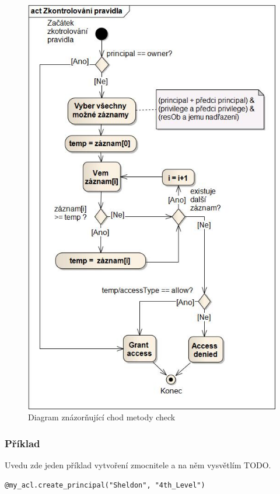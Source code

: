 \begin{figure}
\includegraphics[width=15cm]{check2.jpg}
\caption{Diagram znázorňující chod metody check}
\label{fig:check}
\end{figure}

\subsubsection{Příklad}
Uvedu zde jeden příklad vytvoření zmocnitele a na něm vysvětlím TODO.

\lstset{language=Ruby, numbers=none}
\begin{lstlisting}
@my_acl.create_principal("Sheldon", "4th_Level")
\end{lstlisting}

